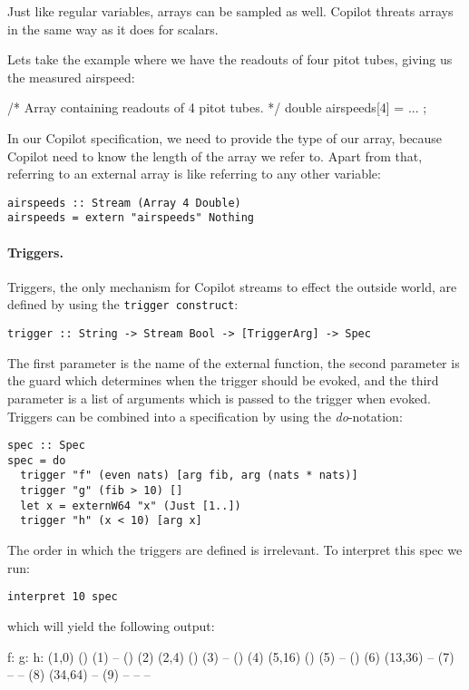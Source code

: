Just like regular variables, arrays can be sampled as well. Copilot threats
arrays in the same way as it does for scalars. 
\begin{example}
\label{exmp:pitot}
Lets take the example where we
have the readouts of four pitot tubes, giving us the measured airspeed:
\begin{code}[frame=single]
/* Array containing readouts of 4 pitot tubes. */
double airspeeds[4] = ... ;
\end{code}
In our Copilot specification, we need to provide the type of our array, because
Copilot need to know the length of the array we refer to. Apart from that,
referring to an external array is like referring to any other variable:
\begin{lstlisting}[language=Copilot, frame=single]
airspeeds :: Stream (Array 4 Double)
airspeeds = extern "airspeeds" Nothing
\end{lstlisting}
\end{example}


\paragraph{Triggers.}
Triggers, the only mechanism for Copilot streams to effect the outside world,
are defined by using the {\tt trigger construct}:
%
\begin{lstlisting}[language = Copilot, frame = single]
trigger :: String -> Stream Bool -> [TriggerArg] -> Spec
\end{lstlisting}
%
The first parameter is the name of the external function, the second parameter is the
guard which determines when the trigger should be evoked, and the third parameter
is a list of arguments which is passed to the trigger when evoked.
Triggers can be combined into a specification by using the \emph{do}-notation:
%
\begin{lstlisting}[language = Copilot, frame = single]
spec :: Spec
spec = do
  trigger "f" (even nats) [arg fib, arg (nats * nats)]
  trigger "g" (fib > 10) []
  let x = externW64 "x" (Just [1..])
  trigger "h" (x < 10) [arg x]
\end{lstlisting}
%
The order in which the triggers are defined is irrelevant. To interpret this spec we run:
%
\begin{lstlisting}[language = Copilot, frame = single]
interpret 10 spec
\end{lstlisting}
%
which will yield the following output:
%
\begin{code}
f:        g:	 h:
(1,0)     ()        (1)
--        ()        (2)
(2,4)     ()        (3)
--        ()        (4)
(5,16)    ()        (5)
--        ()        (6)
(13,36)   --	(7)
--        --        (8)
(34,64)   --	(9)
--        --         --
\end{code}
%

